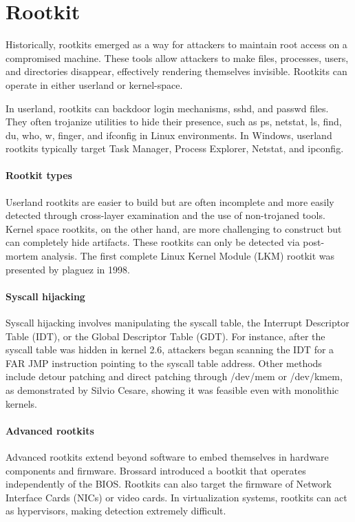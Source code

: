 \section{Rootkit}

Historically, rootkits emerged as a way for attackers to maintain root access on a compromised machine. 
These tools allow attackers to make files, processes, users, and directories disappear, effectively rendering themselves invisible.
Rootkits can operate in either userland or kernel-space.

In userland, rootkits can backdoor login mechanisms, sshd, and passwd files. 
They often trojanize utilities to hide their presence, such as ps, netstat, ls, find, du, who, w, finger, and ifconfig in Linux environments. 
In Windows, userland rootkits typically target Task Manager, Process Explorer, Netstat, and ipconfig.

\paragraph*{Rootkit types}
Userland rootkits are easier to build but are often incomplete and more easily detected through cross-layer examination and the use of non-trojaned tools. 
Kernel space rootkits, on the other hand, are more challenging to construct but can completely hide artifacts. 
These rootkits can only be detected via post-mortem analysis. 
The first complete Linux Kernel Module (LKM) rootkit was presented by plaguez in 1998.

\paragraph*{Syscall hijacking}
Syscall hijacking involves manipulating the syscall table, the Interrupt Descriptor Table (IDT), or the Global Descriptor Table (GDT). 
For instance, after the syscall table was hidden in kernel 2.6, attackers began scanning the IDT for a FAR JMP instruction pointing to the syscall table address. 
Other methods include detour patching and direct patching through /dev/mem or /dev/kmem, as demonstrated by Silvio Cesare, showing it was feasible even with monolithic kernels.

\paragraph*{Advanced rootkits}
Advanced rootkits extend beyond software to embed themselves in hardware components and firmware. 
Brossard introduced a bootkit that operates independently of the BIOS. 
Rootkits can also target the firmware of Network Interface Cards (NICs) or video cards. 
In virtualization systems, rootkits can act as hypervisors, making detection extremely difficult.